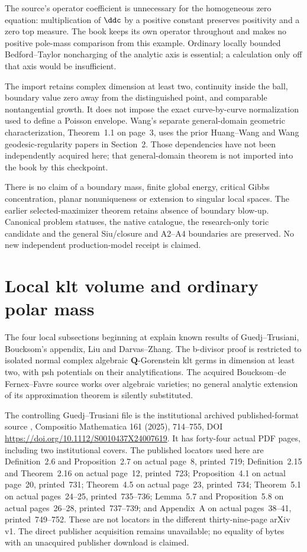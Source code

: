 The source's operator coefficient is unnecessary for the homogeneous
zero equation: multiplication of $\ddc$ by a positive constant
preserves positivity and a zero top measure. The book keeps its
own operator throughout and makes no positive pole-mass comparison
from this example. Ordinary locally bounded Bedford--Taylor
noncharging of the analytic axis is essential; a calculation only
off that axis would be insufficient.

The import retains complex dimension at least two, continuity inside
the ball, boundary value zero away from the distinguished point,
and comparable nontangential growth. It does not impose the exact
curve-by-curve normalization used to define a Poisson envelope.
Wang's separate general-domain geometric characterization,
Theorem~1.1 on page~3, uses the prior Huang--Wang and Wang
geodesic-regularity papers in Section~2. Those dependencies have
not been independently acquired here; that general-domain theorem
is not imported into the book by this checkpoint.

There is no claim of a boundary mass, finite global energy,
critical Gibbs concentration, planar nonuniqueness or extension
to singular local spaces. The earlier selected-maximizer theorem
retains absence of boundary blow-up. Canonical problem statuses,
the native catalogue, the research-only toric candidate and the
general Siu/closure and A2--A4 boundaries are preserved. No new
independent production-model receipt is claimed.

\section{Local klt volume and ordinary polar mass}
\label{sec:provenance-local-klt-volume}

The four local subsections beginning at
 explain known results of
Guedj--Trusiani, Boucksom's appendix, Liu and Darvas--Zhang.
The b-divisor proof is restricted to isolated normal complex
algebraic $\mathbf Q$-Gorenstein klt germs in dimension at least
two, with psh potentials on their analytifications. The acquired
Boucksom--de Fernex--Favre source works over algebraic varieties;
no general analytic extension of its approximation theorem is
silently substituted.

The controlling Guedj--Trusiani file is the institutional archived
published-format source \cite{GuedjTrusiani25LocalPublished},
Compositio Mathematica 161 (2025), 714--755,
DOI \url{https://doi.org/10.1112/S0010437X24007619}.
It has forty-four actual PDF pages,
including two institutional covers. The published locators used
here are Definition~2.6 and Proposition~2.7 on actual page~8,
printed~719; Definition~2.15 and Theorem~2.16 on actual page~12,
printed~723; Proposition~4.1 on actual page~20, printed~731;
Theorem~4.5 on actual page~23, printed~734; Theorem~5.1 on
actual pages~24--25, printed~735--736; Lemma~5.7 and
Proposition~5.8 on actual pages~26--28, printed~737--739; and
Appendix~A on actual pages~38--41, printed~749--752.
These are not locators in the different thirty-nine-page arXiv v1.
The direct publisher acquisition remains unavailable; no equality
of bytes with an unacquired publisher download is claimed.

